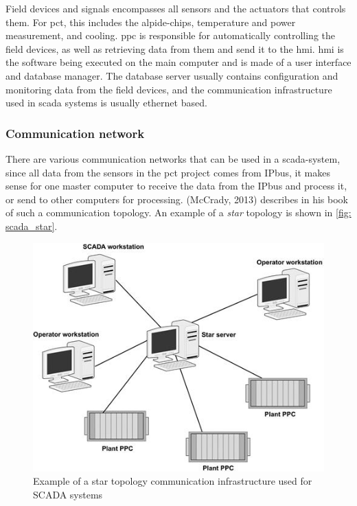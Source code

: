 \documentclass[main.tex]{subfiles}
\begin{document}
Field devices and signals encompasses all sensors and the actuators that controls them. For \gls{pct}, this includes the \gls{alpide}-chips, temperature and power measurement, and cooling. \gls{ppc} is responsible for automatically controlling the field devices, as well as retrieving data from them and send it to the \gls{hmi}. \gls{hmi} is the software being executed on the main computer and is made of a user interface and database manager. The database server usually contains configuration and monitoring data from the field devices, and the communication infrastructure used in \gls{scada} systems is usually ethernet based.

\subsubsection{Communication network}
There are various communication networks that can be used in a \gls{scada}-system, since all data from the sensors in the \gls{pct} project comes from IPbus, it makes sense for one master computer to receive the data from the IPbus and process it, or send to other computers for processing. (McCrady, 2013) describes in his book of such a communication topology\cite{scada_design}. An example of a \textit{star} topology is shown in \autoref{fig: scada_star}.

\begin{figure}[!ht]
    \centering
    \includegraphics[scale=0.6]{images/scada_topology.png}
    \caption{Example of a star topology communication infrastructure used for SCADA systems\cite{scada_design}}
    \label{fig: scada_star}
\end{figure}
\FloatBarrier
\end{document}
